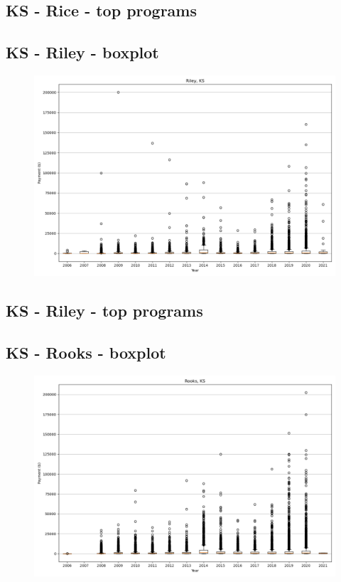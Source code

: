 \subsection*{KS - Rice - top programs}

\newpage
\subsection*{KS - Riley - boxplot}
\begin{figure}[h]
\centering
\includegraphics[width=7in]{../output/boxplots/counties/Riley-KS_boxplot.png}
\end{figure}


\subsection*{KS - Riley - top programs}

\newpage
\subsection*{KS - Rooks - boxplot}
\begin{figure}[h]
\centering
\includegraphics[width=7in]{../output/boxplots/counties/Rooks-KS_boxplot.png}
\end{figure}


